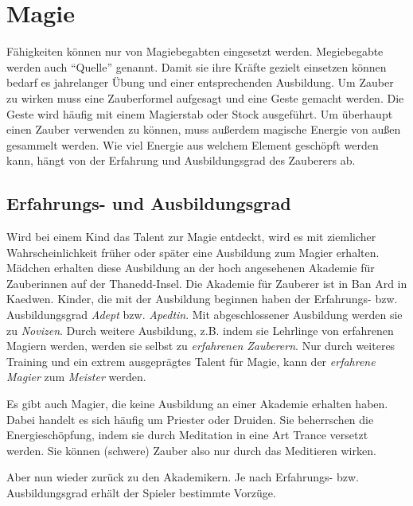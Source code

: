 {\let\clearpage\relax\chapter{Magie}}
Fähigkeiten können nur von Magiebegabten eingesetzt werden. Megiebegabte werden auch "`Quelle"' genannt. Damit sie ihre Kräfte gezielt einsetzen können bedarf es jahrelanger Übung und einer entsprechenden Ausbildung. Um Zauber zu wirken muss eine Zauberformel aufgesagt und eine Geste gemacht werden. Die Geste wird häufig mit einem Magierstab oder Stock ausgeführt. Um überhaupt einen Zauber verwenden zu können, muss außerdem magische Energie von außen gesammelt werden. Wie viel Energie aus welchem Element geschöpft werden kann, hängt von der Erfahrung und Ausbildungsgrad des Zauberers ab.

\section{Erfahrungs- und Ausbildungsgrad}
\label{chap:ausbildungsgrad}
Wird bei einem Kind das Talent zur Magie entdeckt, wird es mit ziemlicher Wahrscheinlichkeit früher oder später eine Ausbildung zum Magier erhalten. Mädchen erhalten diese Ausbildung an der hoch angesehenen Akademie für Zauberinnen auf der Thanedd-Insel. Die Akademie für Zauberer ist in Ban Ard in Kaedwen. Kinder, die mit der Ausbildung beginnen haben der Erfahrungs- bzw. Ausbildungsgrad \textit{Adept} bzw. \textit{Apedtin}. Mit abgeschlossener Ausbildung werden sie zu \textit{Novizen}. Durch weitere Ausbildung, z.B. indem sie Lehrlinge von erfahrenen Magiern werden, werden sie selbst zu \textit{erfahrenen Zauberern}. Nur durch weiteres Training und ein extrem ausgeprägtes Talent für Magie, kann der \textit{erfahrene Magier} zum \textit{Meister} werden.

Es gibt auch Magier, die keine Ausbildung an einer Akademie erhalten haben. Dabei handelt es sich häufig um Priester oder Druiden. Sie beherrschen die Energieschöpfung, indem sie durch Meditation in eine Art Trance versetzt werden. Sie können (schwere) Zauber also nur durch das Meditieren wirken. 

Aber nun wieder zurück zu den Akademikern. Je nach Erfahrungs- bzw. Ausbildungsgrad erhält der Spieler bestimmte Vorzüge.

